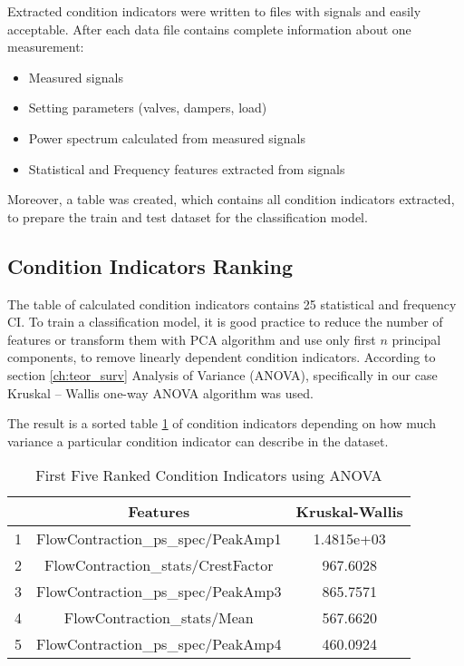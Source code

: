 Extracted condition indicators were written to files with signals and
easily acceptable. After each data file contains complete information about
one measurement:
\begin{itemize}
    \item Measured signals
    \item Setting parameters (valves, dampers, load)
    \item Power spectrum calculated from measured signals
    \item Statistical and Frequency features extracted from signals
\end{itemize}

Moreover, a table was created, which contains all condition indicators
extracted, to prepare the train and test dataset for the classification
model.

\subsection{Condition Indicators Ranking}
The table of calculated condition indicators contains 25 statistical and
frequency CI. To train a classification model, it is good practice to
reduce the number of features or transform them with PCA algorithm and use
only first $n$ principal components, to remove linearly dependent condition
indicators.  According to section \ref{ch:teor_surv} Analysis of Variance (ANOVA),
specifically in our case Kruskal – Wallis one-way ANOVA algorithm was used. 


The result is a sorted table \ref{tab:sorted_ci} of condition indicators depending on
how much variance a particular condition indicator can describe in the
dataset.

\begin{table}[h]
        \centering
    \begin{tabular} {|c|c|c|} \hline
          & Features & Kruskal-Wallis \\ \hline
        1 & FlowContraction\_ps\_spec/PeakAmp1 & 1.4815e+03 \\ \hline
        2 & FlowContraction\_stats/CrestFactor & 967.6028 \\ \hline
        3 & FlowContraction\_ps\_spec/PeakAmp3 & 865.7571 \\ \hline
        4 & FlowContraction\_stats/Mean        & 567.6620 \\ \hline
        5 & FlowContraction\_ps\_spec/PeakAmp4 & 460.0924 \\ \hline
    \end{tabular}
    \caption{First Five Ranked Condition Indicators using ANOVA}
    \label{tab:sorted_ci}
\end{table}


